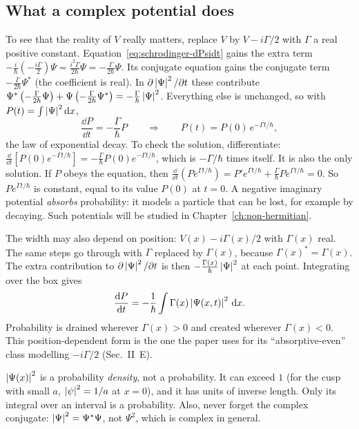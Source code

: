 \subsection{What a complex potential does}

To see that the reality of $V$ really matters, replace $V$ by $V-i\Gamma/2$ with $\Gamma$ a real positive constant. Equation~\eqref{eq:schrodinger-dPsidt} gains the extra term $-\frac i\hbar\left(-\frac{i\Gamma}{2}\right)\Psi=\frac{i^2\Gamma}{2\hbar}\Psi=-\frac{\Gamma}{2\hbar}\Psi$. Its conjugate equation gains the conjugate term $-\frac{\Gamma}{2\hbar}\Psi^*$ (the coefficient is real). In $\partial\left\lvert \Psi\right\rvert^2/\partial t$ these contribute $\Psi^*\left(-\frac{\Gamma}{2\hbar}\Psi\right)+\Psi\left(-\frac\Gamma{2\hbar}\Psi^*\right)=-\frac\Gamma\hbar\left\lvert \Psi\right\rvert^2$. Everything else is unchanged, so with $P(t)=\int\left\lvert \Psi\right\rvert^2\mathrm{d} x$,
\begin{equation}
\frac{\dd P}{\dd t}=-\frac\Gamma\hbar P\qquad\Longrightarrow\qquad P(t)=P(0)\,e^{-\Gamma t/\hbar},
\label{eq:schrodinger-decay}
\end{equation}
the law of exponential decay. To check the solution, differentiate: $\frac{\dd}{\dd t}\left[P(0)e^{-\Gamma t/\hbar}\right]=-\frac\Gamma\hbar P(0)e^{-\Gamma t/\hbar}$, which is $-\Gamma/\hbar$ times itself. It is also the only solution. If $P$ obeys the equation, then $\frac{\dd}{\dd t}\left(Pe^{\Gamma t/\hbar}\right)=P'e^{\Gamma t/\hbar}+\frac\Gamma\hbar Pe^{\Gamma t/\hbar}=0$. So $Pe^{\Gamma t/\hbar}$ is constant, equal to its value $P(0)$ at $t=0$. A negative imaginary potential \emph{absorbs} probability: it models a particle that can be lost, for example by decaying. Such potentials will be studied in Chapter~\ref{ch:non-hermitian}.

The width may also depend on position: $V(x)-i\Gamma(x)/2$ with $\Gamma(x)$ real. The same steps go through with $\Gamma$ replaced by $\Gamma(x)$, because $\Gamma(x)^*=\Gamma(x)$. The extra contribution to $\partial\left\lvert \Psi\right\rvert^2/\partial t$ is then $-\frac{\Gamma(x)}{\hbar}\left\lvert \Psi\right\rvert^2$ at each point. Integrating over the box gives
\begin{equation}
\frac{\mathrm{d} P}{\mathrm{d} t}=-\frac1\hbar\int\Gamma(x)\left\lvert \Psi(x,t)\right\rvert^2\,\mathrm{d} x.
\label{eq:schrodinger-decay-x}
\end{equation}
Probability is drained wherever $\Gamma(x)>0$ and created wherever $\Gamma(x)<0$. This position-dependent form is the one the paper uses for its ``absorptive-even'' class modelling $-i\Gamma/2$ (Sec.~II~E).

\begin{pitfall}
$\left\lvert \Psi(x)\right\rvert^2$ is a probability \emph{density}, not a probability. It can exceed $1$ (for the cusp with small $a$, $\left\lvert \psi\right\rvert^2=1/a$ at $x=0$), and it has units of inverse length. Only its integral over an interval is a probability. Also, never forget the complex conjugate: $\left\lvert \Psi\right\rvert^2=\Psi^*\Psi$, not $\Psi^2$, which is complex in general.
\end{pitfall}

